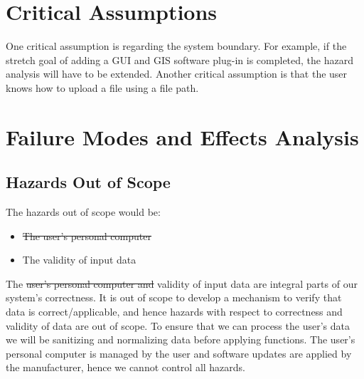 \documentclass{article}
\begin{document}
\section{Critical Assumptions}
One critical assumption is regarding the system boundary. For example, if the stretch goal of adding a GUI and GIS software plug-in is completed, the hazard analysis will have to be extended. Another critical assumption is that the user knows how to upload a file using a file path. \\

\section{Failure Modes and Effects Analysis}
\subsection{Hazards Out of Scope}
The hazards out of scope would be:
\begin{itemize}
    \item \sout{The user's personal computer}
    \item The validity of input data
\end{itemize}

\noindent The \sout{user's personal computer and} validity of input data are integral parts of our system's correctness. It is out of scope to develop a mechanism to verify that data is correct/applicable, and hence hazards with respect to correctness and validity of data are out of scope. To ensure that we can process the user's data we will be sanitizing and normalizing data before applying functions. The user's personal computer is managed by the user and software updates are applied by the manufacturer, hence we cannot control all hazards. 
\end{document}
